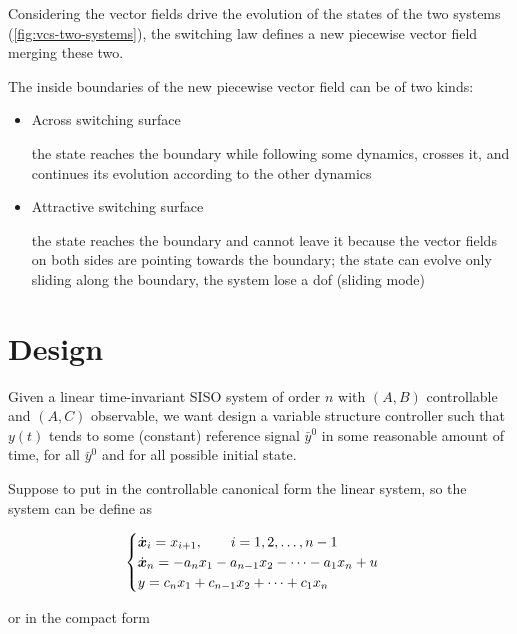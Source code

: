 Considering the vector fields drive the evolution of the states of the two systems (\cref{fig:vcs-two-systems}), the switching law defines a new piecewise vector field merging these two.

The inside boundaries of the new piecewise vector field can be of two kinds:

\begin{itemize}
    \item Across switching surface

    the state reaches the boundary while following some dynamics, crosses it, and continues its evolution according to the other dynamics

    \item Attractive switching surface

    the state reaches the boundary and cannot leave it because the vector fields on both sides are pointing towards the boundary;
    the state can evolve only sliding along the boundary, the system lose a dof (sliding mode)
\end{itemize}

\section{Design}

Given a linear time-invariant SISO system of order $n$ with $(A,B)$ controllable and $(A,C)$ observable, we want design a variable structure controller such that $y(t)$ tends to some (constant) reference signal $\bar y^0$ in some reasonable amount of time, for all $\bar y^0$ and for all possible initial state.

Suppose to put in the controllable canonical form the linear system, so the system can be define as

\[
    \begin{cases}
        \dot{\boldsymbol{x}}_i = x_{i+1}, \qquad i = 1,2,\dots, n-1 \\
        \dot{\boldsymbol{x}}_n = - a_n x_1 - a_{n-1} x_2 - \dots - a_1 x_n + u \\
        y = c_n x_1 + c_{n-1} x_2 + \dots + c_1 x_n
    \end{cases}
\]

or in the compact form

